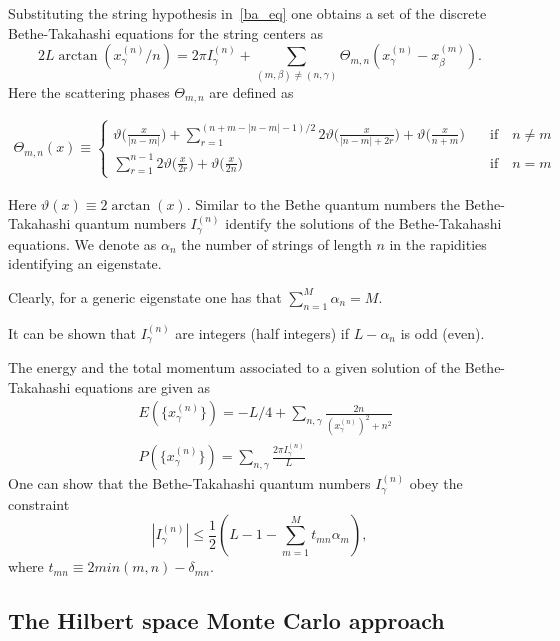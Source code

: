 \documentclass[twocolumn,superscriptaddress,prb,10pt]{revtex4-1}
\begin{document}
Substituting the string hypothesis in~\eqref{ba_eq} one obtains a set of 
the discrete Bethe-Takahashi equations for the string centers as 
%
\begin{equation}
2L\arctan(x_\gamma^{(n)}/n)=2\pi I_\gamma^{(n)}+\sum\limits_{(m,\beta)
\ne(n,\gamma)}\Theta_{m,n}(x_\gamma^{(n)}-x_\beta^{(m)}).
\label{bt-eq}
\end{equation}
%
Here the scattering phases $\Theta_{m,n}$ are defined as 
%
\begin{widetext}
\begin{eqnarray}
\nonumber\Theta_{m,n}(x)\equiv\left\{\begin{array}{cc}
\vartheta\big(\frac{x}{|n-m|}\big)+\!\!\!\!\!\sum
\limits_{r=1}^{(n+m-|n-m|-1)/2}\!\!\!\!\!2\vartheta\big(\frac{x}
{|n-m|+2r}\big)+\vartheta\big(\frac{x}{n+m}\big) & \quad\mbox{if}
\quad n\ne m\\\sum\limits_{r=1}^{n-1}2\vartheta\big(\frac{x}{2r}\big)+
\vartheta\big(\frac{x}{2n}\big) & \quad\mbox{if}\quad n=m
\end{array}\right.
\end{eqnarray}
\end{widetext}
%
Here $\vartheta(x)\equiv 2\arctan(x)$. Similar to the Bethe quantum numbers 
the Bethe-Takahashi quantum numbers $I_{\gamma}^{(n)}$ identify the solutions 
of the Bethe-Takahashi equations. We denote as $\alpha_n$ the number of 
strings of length $n$ in the rapidities identifying an eigenstate. 

Clearly, for a generic eigenstate one has that $\sum_{n=1}^M\alpha_n=M$. 

It can be shown that $I_\gamma^{(n)}$ are integers (half integers) if 
$L-\alpha_n$ is odd (even). 

The energy and the total momentum associated to a given solution of the 
Bethe-Takahashi equations are given as 
%
\begin{align}
& E(\{x_\gamma^{(n)}\})=-L/4+\sum\limits_{n,\gamma}\frac{2n}{
(x_\gamma^{(n)})^2+n^2}\\
& P(\{x_\gamma^{(n)}\})=\sum\limits_{n,\gamma}\frac{2\pi 
I_\gamma^{(n)}}{L}
\end{align}
%
One can show that the Bethe-Takahashi quantum numbers $I_\gamma^{(n)}$ obey 
the constraint 
%
\begin{equation}
\label{bt-bounds}
|I_\gamma^{(n)}|\le\frac{1}{2}(L-1-\sum\limits_{m=1}^Mt_{mn}\alpha_m),
\end{equation}
%
where $t_{mn}\equiv 2 min(m,n)-\delta_{mn}$. 

\subsection{The Hilbert space Monte Carlo approach}
\end{document}
